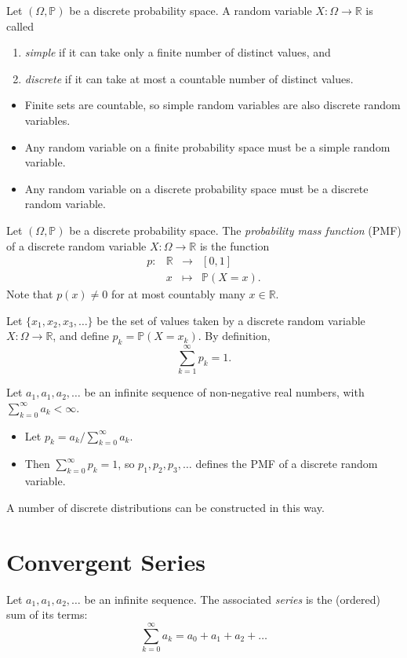 \documentclass[lecture]{csm}
\newcommand{\prob}{\mathbb{P}}
\newcommand{\R}{\mathbb{R}}
\def\it{\item}
\def\bit{\begin{itemize}}
\def\eit{\end{itemize}}
\def\ben{\begin{enumerate}}
\def\een{\end{enumerate}}
\begin{document}
\begin{definition}
Let $(\Omega,\prob)$ be a discrete probability space. A random variable $X:\Omega\to\R$ is called
\ben
\it \emph{simple} if it can take only a finite number of distinct values, and 
\it \emph{discrete} if it can take at most a countable number of distinct values.
\een
\end{definition}

\begin{remark}
\bit
\it Finite sets are countable, so simple random variables are also discrete random variables.
\it Any random variable on a finite probability space must be a simple random variable.
\it Any random variable on a discrete probability space must be a discrete random variable.
\eit
\end{remark}

\newpage

\begin{definition}
Let $(\Omega,\prob)$ be a discrete probability space. The \emph{probability mass function} (PMF) of a discrete random variable $X:\Omega\to\R$ is the function
\[
\begin{array}{cccl}
p:	& \mathbb{R}	& \longrightarrow	& [0,1] \\
	& x 			& \mapsto			& \prob(X = x).
\end{array}
\]
Note that $p(x)\neq 0$ for at most countably many $x\in\R$.
\end{definition}

Let $\{x_1,x_2,x_3,\ldots\}$ be the set of values taken by a discrete random variable $X:\Omega\to\R$, and define $p_k=\prob(X=x_k)$. By definition,
\[
\sum_{k=1}^{\infty} p_k = 1.
\]

Let $a_1,a_1,a_2,\ldots$ be an infinite sequence of non-negative real numbers, with $\sum_{k=0}^{\infty} a_k < \infty$.
\bit
\it Let $p_k = a_k/\sum_{k=0}^{\infty} a_k$.
\it Then $\sum_{k=0}^{\infty} p_k = 1$, so $p_1,p_2,p_3,\ldots$ defines the PMF of a discrete random variable.
\eit
\vspace*{2ex}
A number of discrete distributions can be constructed in this way.
\newpage
\section{Convergent Series}
Let $a_1,a_1,a_2,\ldots$ be an infinite sequence. The associated \emph{series} is the (ordered) sum of its terms:
\[
\sum_{k=0}^{\infty} a_k = a_0 + a_1 + a_2 + \ldots
\]
\end{document}
